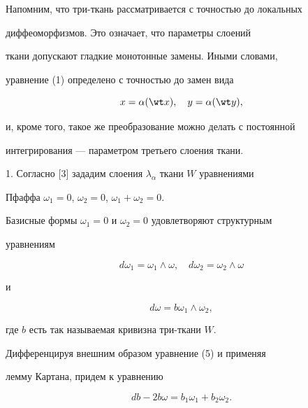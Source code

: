  


 


Напомним, что три-ткань рассматривается с точностью до локальных 


диффеоморфизмов. Это означает, что параметры слоений 


ткани допускают гладкие монотонные замены. Иными словами, 


уравнение (1) определено с точностью до замен вида 


\begin{equation} 


x=\alpha(\wt x),\quad y=\alpha(\wt y), 


\end{equation} 


и, кроме того, такое же преобразование можно делать с постоянной 


интегрирования --- параметром третьего слоения ткани. 


\medskip 


 


1. Согласно [3] зададим слоения $\lambda_\alpha$ ткани $W$ уравнениями 


Пфаффа $\omega_1=0$, $\omega_2=0$, $\omega_1+\omega_2=0$. 


Базисные формы $\omega_1=0$ и $\omega_2=0$ удовлетворяют структурным 


уравнениям 


\begin{equation} 


d\omega_1=\omega_1\wedge\omega,\quad 


d\omega_2=\omega_2\wedge\omega 


\end{equation} 


и 


\begin{equation} 


d\omega=b\omega_1\wedge\omega_2, 


\end{equation} 


где $b$ есть так называемая кривизна три-ткани $W$. 


 


Дифференцируя внешним образом уравнение (5) и применяя 


лемму Картана, придем к уравнению 


\begin{equation} 


db-2b\omega=b_1\omega_1+b_2\omega_2. 


\end{equation} 


